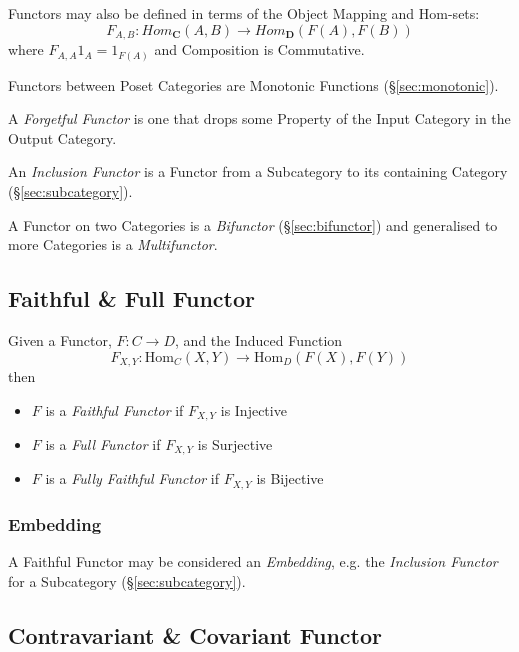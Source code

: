 Functors may also be defined in terms of the Object Mapping and Hom-sets:
\[
    F_{A,B} : Hom_{\mathbf{C}}(A,B) \rightarrow Hom_{\mathbf{D}}(F(A),F(B))
\]
where $F_{A,A}1_A = 1_{F(A)}$ and Composition is Commutative.

Functors between Poset Categories are Monotonic Functions
(\S\ref{sec:monotonic}).

A \emph{Forgetful Functor} is one that drops some Property of the
Input Category in the Output Category.

An \emph{Inclusion Functor} is a Functor from a Subcategory to its
containing Category (\S\ref{sec:subcategory}).

A Functor on two Categories is a \emph{Bifunctor}
(\S\ref{sec:bifunctor}) and generalised to more Categories is a
\emph{Multifunctor}.



\subsection{Faithful \& Full Functor}\label{sec:faithful_functor}

Given a Functor, $F : C \rightarrow D$, and the Induced Function
\[
    F_{X,Y} : \mathrm{Hom}_C(X,Y) \rightarrow \mathrm{Hom}_D(F(X),F(Y))
\]
then
\begin{itemize}
    \item $F$ is a \emph{Faithful Functor} if $F_{X,Y}$ is Injective
    \item $F$ is a \emph{Full Functor} if $F_{X,Y}$ is Surjective
    \item $F$ is a \emph{Fully Faithful Functor} if $F_{X,Y}$ is
      Bijective
\end{itemize}



\subsubsection{Embedding}\label{sec:category_embedding}

A Faithful Functor may be considered an \emph{Embedding}, e.g. the
\emph{Inclusion Functor} for a Subcategory
(\S\ref{sec:subcategory}).



\subsection{Contravariant \& Covariant Functor}
\label{sec:contravariant_functor}


